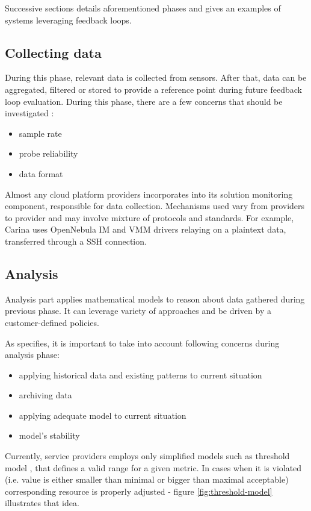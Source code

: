 Successive sections details aforementioned phases and gives an examples of systems leveraging feedback loops.

\subsection{Collecting data}
During this phase, relevant data is collected from sensors. After that, data can be aggregated, filtered or stored to provide a reference point during future feedback loop evaluation. During this phase, there are a few concerns that should be investigated \cite{brun2009engineering}:
\begin{itemize}
 \item sample rate
 \item probe reliability
 \item data format
\end{itemize}

Almost any cloud platform providers incorporates into its solution monitoring component, responsible for data collection. Mechanisms used vary from providers to provider and may involve mixture of protocols and standards. For example, Carina \cite{Carina} uses OpenNebula IM and VMM drivers relaying on a plaintext data, transferred through a SSH connection.

\subsection{Analysis}
Analysis part applies mathematical models to reason about data gathered during previous phase. It can leverage variety of approaches and be driven by a customer-defined policies.

As \cite{brun2009engineering} specifies, it is important to take into account following concerns during analysis phase:
\begin{itemize}
 \item applying historical data and existing patterns to current situation
 \item archiving data
 \item applying adequate model to current situation
 \item model's stability
\end{itemize}

Currently, service providers employs only simplified models such as threshold model \cite{LiWoZh05}, that defines a valid range for a given metric. In cases when it is violated (i.e. value is either smaller than minimal or bigger than maximal acceptable) corresponding resource is properly adjusted - figure \ref{fig:threshold-model} illustrates that idea.

